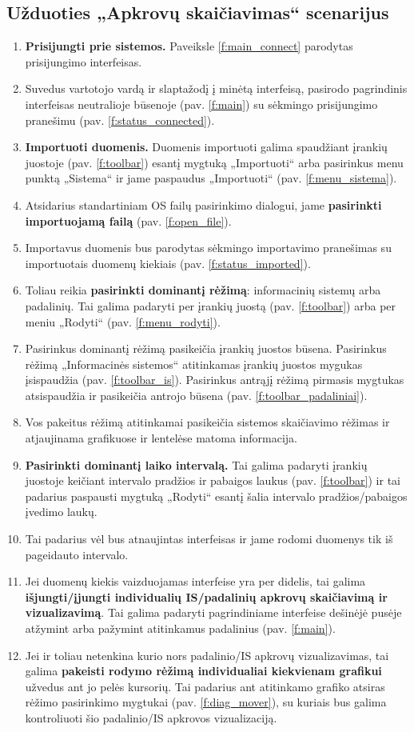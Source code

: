 \subsection{Užduoties „Apkrovų skaičiavimas“ scenarijus}
\begin{enumerate}
  \item \textbf{Prisijungti prie sistemos.} Paveiksle \ref{f:main_connect} parodytas prisijungimo
  interfeisas.
  \item Suvedus vartotojo vardą ir slaptažodį į minėtą interfeisą, pasirodo pagrindinis interfeisas neutralioje būsenoje (pav. \ref{f:main}) su sėkmingo prisijungimo pranešimu (pav. \ref{f:status_connected}).
  \item \textbf{Importuoti duomenis.} Duomenis importuoti galima spaudžiant įrankių juostoje (pav. \ref{f:toolbar}) esantį mygtuką „Importuoti“ arba pasirinkus menu punktą „Sistema“ ir jame paspaudus „Importuoti“ (pav. \ref{f:menu_sistema}).
  \item Atsidarius standartiniam OS failų pasirinkimo dialogui, jame \textbf{pasirinkti importuojamą failą} (pav. \ref{f:open_file}).
  \item Importavus duomenis bus parodytas sėkmingo importavimo pranešimas su importuotais duomenų kiekiais (pav. \ref{f:status_imported}).
  \item Toliau reikia \textbf{pasirinkti dominantį rėžimą}: informacinių sistemų arba padalinių. Tai galima padaryti per įrankių juostą (pav. \ref{f:toolbar}) arba per meniu „Rodyti“ (pav. \ref{f:menu_rodyti}).
  \item Pasirinkus dominantį rėžimą pasikeičia įrankių juostos būsena. Pasirinkus rėžimą „Informacinės sistemos“ atitinkamas įrankių juostos mygukas įsispaudžia (pav. \ref{f:toolbar_is}). Pasirinkus antrąjį rėžimą pirmasis mygtukas atsispaudžia ir pasikeičia antrojo būsena (pav. \ref{f:toolbar_padaliniai}).
  \item Vos pakeitus rėžimą atitinkamai pasikeičia sistemos skaičiavimo rėžimas ir atjaujinama grafikuose ir lentelėse matoma informacija.
  \item \textbf{Pasirinkti dominantį laiko intervalą.} Tai galima padaryti įrankių juostoje keičiant intervalo pradžios ir pabaigos laukus (pav. \ref{f:toolbar}) ir tai padarius paspausti mygtuką „Rodyti“ esantį šalia intervalo pradžios/pabaigos įvedimo laukų.
  \item Tai padarius vėl bus atnaujintas interfeisas ir jame rodomi duomenys tik iš pageidauto intervalo.
  \item Jei duomenų kiekis vaizduojamas interfeise yra per didelis, tai galima \textbf{išjungti/įjungti individualių IS/padalinių apkrovų skaičiavimą ir vizualizavimą}. Tai galima padaryti pagrindiniame interfeise dešinėjė pusėje atžymint arba pažymint atitinkamus padalinius (pav. \ref{f:main}).
  \item Jei ir toliau netenkina kurio nors padalinio/IS apkrovų vizualizavimas, tai galima \textbf{pakeisti rodymo rėžimą individualiai kiekvienam grafikui} užvedus ant jo pelės kursorių. Tai padarius ant atitinkamo grafiko atsiras rėžimo pasirinkimo mygtukai (pav. \ref{f:diag_mover}), su kuriais bus galima kontroliuoti šio padalinio/IS apkrovos vizualizaciją.
\end{enumerate}


